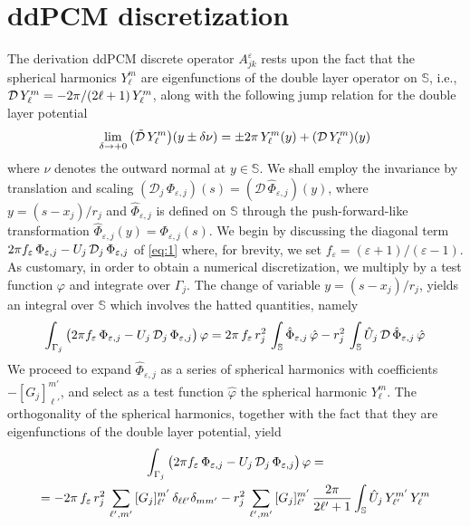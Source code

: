 \section{ddPCM discretization\label{app:mats}}
The derivation ddPCM discrete operator $A^\varepsilon_{jk}$ rests upon the fact that the spherical harmonics $Y_\ell^m$ are eigenfunctions of the double layer operator on $\mathbb{S}$, i.e., $\mathcal{D} \, Y_\ell^m =  -2\pi/ (2\ell+1) \,  Y_\ell^m$, along with the following jump relation for the double layer potential
\begin{equation}\label{eq:jump}
	\lim_{\delta \to + 0} \big(\tilde{\mathcal{D}} \, Y_\ell^m\big)(y \pm \delta \nu) =  \pm 2\pi \, Y_\ell^m(y)+ ( \mathcal{D} \, Y_\ell^m )(y)
\end{equation}
where $\nu$ denotes the outward normal at $y \in \mathbb{S}$. We shall employ the invariance by translation and scaling $(\mathcal{D}_j \, \Phi_{\varepsilon,j})(s) = (\mathcal{D} \, \hat{\Phi}_{\varepsilon,j})(y)$, where $y = (s - x_j)/r_j$ and $\hat{\Phi}_{\varepsilon,j}$ is defined on $\mathbb{S}$ through the push-forward-like transformation $\hat{\Phi}_{\varepsilon,j}(y) = \Phi_{\varepsilon,j}(s)$. We begin by discussing the diagonal term $2\pi f_\varepsilon \, \Phi_{\varepsilon,j} - U_j \, \mathcal{D}_j \, \Phi_{\varepsilon,j}$ of \eqref{eq:1} where, for brevity, we set $f_\varepsilon = (\varepsilon + 1)/(\varepsilon - 1)$. As customary, in order to obtain a numerical discretization, we multiply by a test function $\varphi$ and integrate over $\Gamma_j$.  The change of variable $y = (s- x_j)/r_j$, yields an integral over $\mathbb{S}$ which involves the hatted quantities, namely
\[
\int_{\Gamma_j} \big(2\pi f_\varepsilon \, \Phi_{\varepsilon,j}  - U_j \, \mathcal{D}_j \, \Phi_{\varepsilon,j} \big) \, \varphi = 2 \pi  \, f_\varepsilon \, r_j^2 \,\int_\mathbb{S} \hat{\Phi}_{\varepsilon,j}  \, \hat{\varphi} - r_j^2 \, \int_\mathbb{S} \hat{U}_j \, \mathcal{D} \, \hat{\Phi}_{\varepsilon,j}  \, \hat{\varphi}
\]
We proceed to expand $\hat{\Phi}_{\varepsilon,j}$ as a series of spherical harmonics with coefficients $-[G_j]_{\ell'}^{m'}$, and select as a test function $\hat{\varphi}$  the spherical harmonic $Y_{\ell}^{m}$. The orthogonality of the spherical harmonics, together with the fact that they are eigenfunctions of the double layer potential, yield
\begin{multline*}
\int_{\Gamma_j} \big(2\pi f_\varepsilon \, \Phi_{\varepsilon,j}  - U_j \, \mathcal{D}_j \, \Phi_{\varepsilon,j} \big) \, \varphi = \\
= - 2 \pi  \, f_\varepsilon \, r_j^2 \,\sum_{\ell',m'}  \, [G_j]_{\ell'}^{m'} \, \delta_{\ell \ell'} \delta_{mm'}  - r_j^2 \, \sum_{\ell',m'} \, [G_j]_{\ell'}^{m'} \, \frac{2\pi}{2\ell'+1} \int_{\mathbb{S}} \hat{U}_j \,  Y_{\ell'}^{m'}\, Y_\ell^m
\end{multline*}
